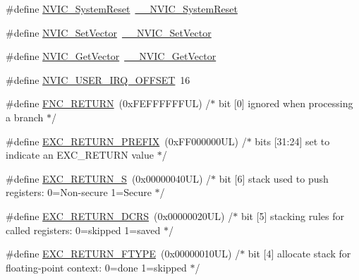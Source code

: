 \begin{DoxyCompactItemize}
\item 
\#define \hyperlink{group___c_m_s_i_s___core___n_v_i_c_functions_ga6aa0367d3642575610476bf0366f0c48}{N\+V\+I\+C\+\_\+\+System\+Reset}~\hyperlink{group___c_m_s_i_s___core___n_v_i_c_functions_ga0d9aa2d30fa54b41eb780c16e35b676c}{\+\_\+\+\_\+\+N\+V\+I\+C\+\_\+\+System\+Reset}
\item 
\#define \hyperlink{group___c_m_s_i_s___core___n_v_i_c_functions_ga804af63bb4c4c317387897431814775d}{N\+V\+I\+C\+\_\+\+Set\+Vector}~\hyperlink{group___c_m_s_i_s___core___n_v_i_c_functions_ga0df355460bc1783d58f9d72ee4884208}{\+\_\+\+\_\+\+N\+V\+I\+C\+\_\+\+Set\+Vector}
\item 
\#define \hyperlink{group___c_m_s_i_s___core___n_v_i_c_functions_ga955eb1c33a3dcc62af11a8385e8c0fc8}{N\+V\+I\+C\+\_\+\+Get\+Vector}~\hyperlink{group___c_m_s_i_s___core___n_v_i_c_functions_ga44b665d2afb708121d9b10c76ff00ee5}{\+\_\+\+\_\+\+N\+V\+I\+C\+\_\+\+Get\+Vector}
\item 
\#define \hyperlink{group___c_m_s_i_s___core___n_v_i_c_functions_ga8045d905a5ca57437d8e6f71ffcb6df5}{N\+V\+I\+C\+\_\+\+U\+S\+E\+R\+\_\+\+I\+R\+Q\+\_\+\+O\+F\+F\+S\+ET}~16
\item 
\#define \hyperlink{group___c_m_s_i_s___core___n_v_i_c_functions_gabaa62910bf89acc186ae998c611e64ab}{F\+N\+C\+\_\+\+R\+E\+T\+U\+RN}~(0x\+F\+E\+F\+F\+F\+F\+F\+F\+U\+L)     /$\ast$ bit \mbox{[}0\mbox{]} ignored when processing a branch                             $\ast$/
\item 
\#define \hyperlink{group___c_m_s_i_s___core___n_v_i_c_functions_ga99e0c1c19f050880a8bd827a7f420bec}{E\+X\+C\+\_\+\+R\+E\+T\+U\+R\+N\+\_\+\+P\+R\+E\+F\+IX}~(0x\+F\+F000000\+U\+L)     /$\ast$ bits \mbox{[}31\+:24\mbox{]} set to indicate an E\+X\+C\+\_\+\+R\+E\+T\+U\+R\+N value                     $\ast$/
\item 
\#define \hyperlink{group___c_m_s_i_s___core___n_v_i_c_functions_ga88711355d0196b1ffeb18c33e2c95360}{E\+X\+C\+\_\+\+R\+E\+T\+U\+R\+N\+\_\+S}~(0x00000040\+U\+L)     /$\ast$ bit \mbox{[}6\mbox{]} stack used to push registers\+: 0=\+Non-\/secure 1=\+Secure          $\ast$/
\item 
\#define \hyperlink{group___c_m_s_i_s___core___n_v_i_c_functions_ga0a0f2c03b4aef2c02bdae044bda1324b}{E\+X\+C\+\_\+\+R\+E\+T\+U\+R\+N\+\_\+\+D\+C\+RS}~(0x00000020\+U\+L)     /$\ast$ bit \mbox{[}5\mbox{]} stacking rules for called registers\+: 0=skipped 1=saved       $\ast$/
\item 
\#define \hyperlink{group___c_m_s_i_s___core___n_v_i_c_functions_ga342b51c3eec59822bf206e24ef881a9e}{E\+X\+C\+\_\+\+R\+E\+T\+U\+R\+N\+\_\+\+F\+T\+Y\+PE}~(0x00000010\+U\+L)     /$\ast$ bit \mbox{[}4\mbox{]} allocate stack for floating-\/point context\+: 0=done 1=skipped  $\ast$/

\end{DoxyCompactItemize}
